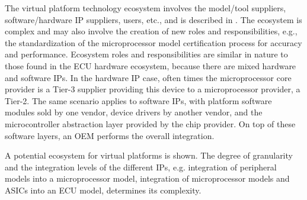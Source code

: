 The virtual platform technology ecosystem involves the model/tool suppliers, software/hardware IP suppliers, users, etc., and is described in \cite{Knauss2014d}.
The ecosystem is complex and may also involve the creation of new roles and responsibilities,
e.g., the standardization of the microprocessor model certification process  for accuracy and performance.
Ecosystem roles and responsibilities are similar in nature to those found in the ECU hardware ecosystem, because there are mixed hardware and software IPs.
In the hardware IP case, often times the microprocessor core provider is a Tier-3 supplier providing this device to a microprocessor provider, a Tier-2.
The same scenario applies to software IPs, with platform software modules sold by one vendor, device drivers by another vendor, and the microcontroller abstraction layer provided by the chip provider.
On top of these software layers, an OEM performs the overall integration.

A potential ecosystem for virtual platforms is shown.
The degree of granularity and the integration levels of the different IPs,
e.g. integration of peripheral models into a microprocessor model, integration of microprocessor models and ASICs into an ECU model,
determines its complexity.
